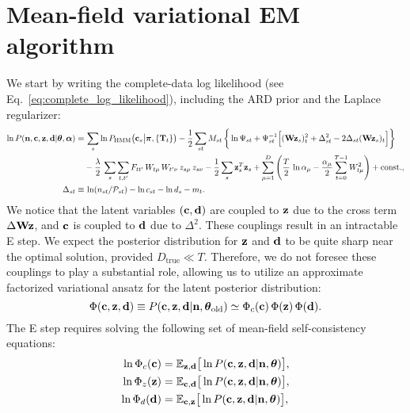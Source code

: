 \documentclass[nofootinbib,amssymb,amsmath]{revtex4}
\newcommand{\vd}{{\bf d}}
\newcommand{\vc}{{\bf c}}
\newcommand{\vz}{{\bf z}}
\newcommand{\vn}{{\bf n}}
\newcommand{\vW}{{\bf W}}
\newcommand{\vtheta}{{\boldsymbol \theta}}
\newcommand{\vpi}{{\boldsymbol \pi}}
\newcommand{\valpha}{{\boldsymbol \alpha}}
\newcommand{\PP}{\mathcal{P}}
\newcommand{\EE}{\mathbb{E}}
\begin{document}
\section{Mean-field variational EM algorithm}
We start by writing the complete-data log likelihood (see Eq.~\ref{eq:complete_log_likelihood}), including the ARD prior and the Laplace regularizer:
\begin{subequations}
\begin{align}
\label{eq:complete_log_likelihood}
\ln P(\vn, \vc, \vz, \vd | \vtheta, \valpha) =&\, \sum_{s} \ln P_\mathrm{HMM}\big(\vc_s \big|\vpi, \{\mathbf{T}_t\}\big) - \frac{1}{2}\sum_{st} M_{st} \, \bigg\{\ln \Psi_{st} + \Psi_{st}^{-1}\Big[(\vW \vz_s)_t^2 + \Delta_{st}^2 - 2\Delta_{st} (\vW \vz_s)_t\Big]\bigg\}\nonumber\\
& - \frac{\lambda}{2} \, \sum_s \sum_{t,t'} F_{tt'} \, W_{t\mu} \, W_{t'\nu} \, z_{s\mu} \, z_{s\nu} - \frac{1}{2}\sum_{s} \vz_s^T \vz_s + \sum_{\mu=1}^{D}\left(\frac{T}{2} \, \ln \alpha_\mu -\frac{\alpha_\mu}{2} \sum_{t=0}^{T-1} W_{t\mu}^2  \right) + \mathrm{const.},\\
\label{eq:delta_def}
\Delta_{st} \equiv&\, \ln(n_{st}/\PP_{st}) - \ln c_{st} - \ln d_s - m_t.
\end{align}
\end{subequations}
We notice that the latent variables $(\vc, \vd)$ are coupled to $\vz$ due to the cross term $\Delta \vW \vz$, and $\vc$ is coupled to $\vd$ due to $\Delta^2$. These couplings result in an intractable E step. We expect the posterior distribution for $\vz$ and $\vd$ to be quite sharp near the optimal solution, provided $D_\mathrm{true} \ll T$. Therefore, we do not foresee these couplings to play a substantial role, allowing us to utilize an approximate factorized variational ansatz for the latent posterior distribution:
\begin{equation}
\Phi(\vc, \vz, \vd) \equiv P(\vc, \vz, \vd | \vn, \vtheta_\mathrm{old}) \simeq \Phi_c(\vc) \, \Phi(\vz) \, \Phi(\vd).
\end{equation}
The E step requires solving the following set of mean-field self-consistency equations:
\begin{subequations}
\begin{align}
\ln \Phi_c(\vc) &= \EE_{\vz, \vd}\big[\ln P(\vc, \vz, \vd | \vn, \vtheta)\big],\\
\ln \Phi_z(\vz) &= \EE_{\vc, \vd}\big[\ln P(\vc, \vz, \vd | \vn, \vtheta)\big],\\
\ln \Phi_d(\vd) &= \EE_{\vc, \vz}\big[\ln P(\vc, \vz, \vd | \vn, \vtheta)\big],
\end{align}
\end{subequations}
\end{document}
